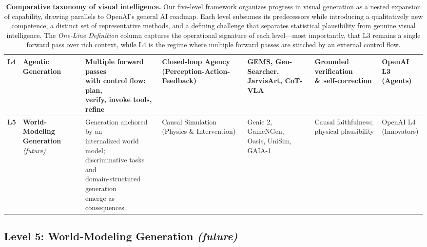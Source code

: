 \documentclass{llmxive}
\begin{document}
\begin{table}[!htp]
{\begin{tabular}{@{}c l l l l l l@{}}
        \textbf{L4} & \textbf{Agentic Generation} & \makecell[l]{Multiple forward passes \\ with control flow: plan, \\ verify, invoke tools, refine} & \makecell[l]{Closed-loop Agency \\ (Perception-Action-Feedback)} & \makecell[l]{GEMS, Gen-Searcher, \\ JarvisArt, CoT-VLA} & \makecell[l]{Grounded verification \\ \& self-correction} & \makecell[l]{OpenAI L3 \\ (Agents)} \\ \midrule
        \textbf{L5} & \makecell[l]{\textbf{World-Modeling} \\ \textbf{Generation} \textit{(future)}} & \makecell[l]{Generation anchored by an \\ internalized world model; \\ discriminative tasks and \\ domain-structured generation \\ emerge as consequences} & \makecell[l]{Causal Simulation \\ (Physics \& Intervention)} & \makecell[l]{Genie 2, GameNGen, \\ Oasis, UniSim, GAIA-1} & \makecell[l]{Causal faithfulness; \\ physical plausibility} & \makecell[l]{OpenAI L4 \\ (Innovators)} \\
        \bottomrule[1pt]
    \end{tabular}%
    }
\caption{\textbf{Comparative taxonomy of visual intelligence.} Our five-level framework organizes progress in visual generation as a nested expansion of capability, drawing parallels to OpenAI's general AI roadmap. Each level subsumes its predecessors while introducing a qualitatively new competence, a distinct set of representative methods, and a defining challenge that separates statistical plausibility from genuine visual intelligence. The \textit{One-Line Definition} column captures the operational signature of each level---most importantly, that L3 remains a single forward pass over rich context, while L4 is the regime where multiple forward passes are stitched by an external control flow.}
\label{tab:5levels}
\end{table}



\subsection{Level 5: World-Modeling Generation \textit{(future)}}
\label{subsec:level5}
\end{document}

